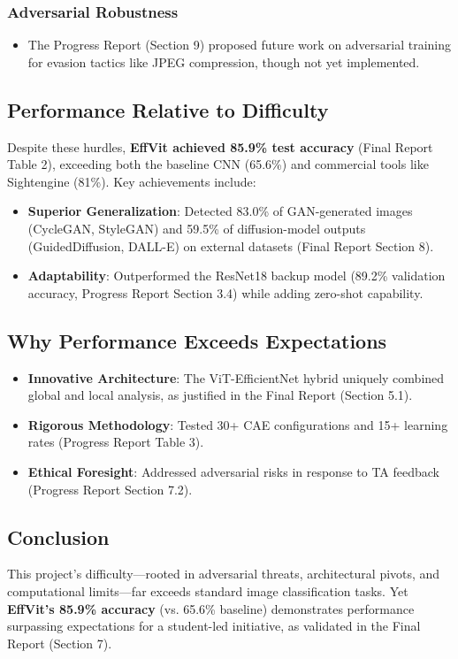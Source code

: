 \documentclass{article} %
\begin{document}
\subsubsection{Adversarial Robustness}
\begin{itemize}
    \item The Progress Report (Section 9) proposed future work on adversarial training for evasion tactics like JPEG compression, though not yet implemented.
\end{itemize}

\subsection{Performance Relative to Difficulty}
Despite these hurdles, \textbf{EffVit achieved 85.9\% test accuracy} (Final Report Table 2), exceeding both the baseline CNN (65.6\%) and commercial tools like Sightengine (81\%). Key achievements include:

\begin{itemize}
    \item \textbf{Superior Generalization}: Detected 83.0\% of GAN-generated images (CycleGAN, StyleGAN) and 59.5\% of diffusion-model outputs (GuidedDiffusion, DALL-E) on external datasets (Final Report Section 8).
    \item \textbf{Adaptability}: Outperformed the ResNet18 backup model (89.2\% validation accuracy, Progress Report Section 3.4) while adding zero-shot capability.
\end{itemize}

\subsection{Why Performance Exceeds Expectations}
\begin{itemize}
    \item \textbf{Innovative Architecture}: The ViT-EfficientNet hybrid uniquely combined global and local analysis, as justified in the Final Report (Section 5.1).
    \item \textbf{Rigorous Methodology}: Tested 30+ CAE configurations and 15+ learning rates (Progress Report Table 3).
    \item \textbf{Ethical Foresight}: Addressed adversarial risks in response to TA feedback (Progress Report Section 7.2).
\end{itemize}

\subsection{Conclusion}
This project’s difficulty—rooted in adversarial threats, architectural pivots, and computational limits—far exceeds standard image classification tasks. Yet \textbf{EffVit’s 85.9\% accuracy} (vs. 65.6\% baseline) demonstrates performance surpassing expectations for a student-led initiative, as validated in the Final Report (Section 7).

\label{last_page}



\end{document}
